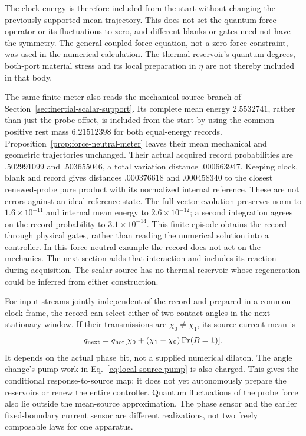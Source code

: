 The clock energy is therefore included from the start without changing
the previously supported mean trajectory. This does not set the quantum
force operator or its fluctuations to zero, and different blanks or
gates need not have the symmetry. The general coupled force equation,
not a zero-force constraint, was used in the numerical calculation.
The thermal reservoir's quantum degrees, both-port material stress and
its local preparation in $\eta$ are not thereby included in that body.

The same finite meter also reads the mechanical-source branch of
Section~\ref{sec:inertial-scalar-support}. Its complete mean energy
$2.5532741$, rather than just the probe offset, is included from the
start by using the common positive rest mass $6.21512398$ for both
equal-energy records. Proposition~\ref{prop:force-neutral-meter} leaves
their mean mechanical and geometric trajectories unchanged.
Their actual acquired record probabilities are $.502991099$ and
$.503655046$, a total variation distance $.000663947$.
Keeping clock, blank and record gives distances $.000376618$ and
$.000458340$ to the closest renewed-probe pure product with its normalized
internal reference. These are not errors against an ideal reference
state. The full vector evolution preserves norm to $1.6\times10^{-11}$
and internal mean energy to $2.6\times10^{-12}$; a second integration
agrees on the record probability to $3.1\times10^{-14}$.
This finite episode obtains the record through physical gates, rather
than reading the numerical solution into a controller. In this force-neutral
example the record does not act on the mechanics. The next section adds
that interaction and includes its reaction during acquisition. The scalar
source has no thermal reservoir whose regeneration could be inferred
from either construction.

For input streams jointly independent of the record and prepared in a
common clock frame, the record can select
either of two contact angles in the next stationary window.
If their transmissions are $\chi_0\ne\chi_1$, its
source-current mean is
\[
 q_{\rm next}=q_{\rm hot}[\chi_0+(\chi_1-\chi_0)\Pr(R=1)].
\]
It depends on the actual phase bit, not a supplied numerical dilaton.
The angle change's pump work in Eq.~\eqref{eq:local-source-pump} is
also charged. This gives the conditional response-to-source map;
it does not yet autonomously prepare the reservoirs or renew the
entire controller. Quantum fluctuations
of the probe force also lie outside the mean-source approximation.
The phase sensor and the earlier fixed-boundary current sensor are
different realizations, not two freely composable laws for one apparatus.

